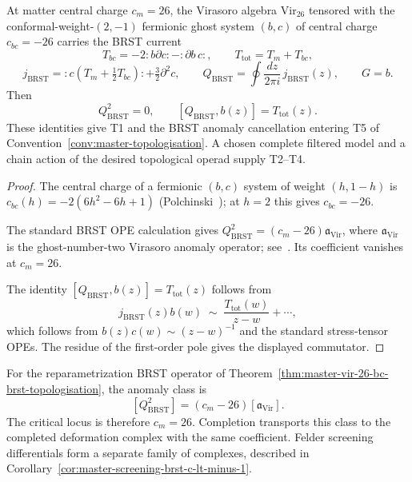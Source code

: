 \begin{theorem}
\label{thm:master-vir-26-bc-brst-topologisation}
At matter central charge $c_m = 26$, the Virasoro algebra
$\mathrm{Vir}_{26}$ tensored with the conformal-weight-$(2, -1)$
fermionic ghost system $(b, c)$ of central charge $c_{bc} = -26$
carries the BRST current
\[
T_{bc} = -2{:}b\partial c{:} - {:}\partial b\, c{:},
\qquad
T_{\mathrm{tot}} = T_m + T_{bc},
\]
\[
j_{\mathrm{BRST}}
= {:}c(T_m+\tfrac12T_{bc}){:}+\tfrac32\partial^2c,
\qquad
Q_{\mathrm{BRST}}=\oint\frac{dz}{2\pi i}\,j_{\mathrm{BRST}}(z),
\qquad
G = b.
\]
Then
\[
Q_{\mathrm{BRST}}^2=0,
\qquad
[Q_{\mathrm{BRST}}, b(z)] = T_{\mathrm{tot}}(z).
\]
These identities give T1 and the BRST anomaly cancellation entering
T5 of Convention~\ref{conv:master-topologisation}.  A chosen complete
filtered model and a chain action of the desired topological operad
supply T2--T4.
\end{theorem}

\begin{proof}
The central charge of a fermionic $(b, c)$ system of weight $(h, 1-h)$
is $c_{bc}(h) = -2(6h^2 - 6h + 1)$
\textup{(}Polchinski~\cite[eq.~(2.5.12)]{Pol98}\textup{);} at $h = 2$
this gives $c_{bc} = -26$.

The standard BRST OPE calculation gives
$Q_{\mathrm{BRST}}^2=(c_m-26)\mathfrak a_{\mathrm{Vir}}$, where
$\mathfrak a_{\mathrm{Vir}}$ is the ghost-number-two Virasoro anomaly
operator; see~\cite[\S4.3]{Pol98}.  Its coefficient vanishes at
$c_m=26$.

The identity $[Q_{\mathrm{BRST}}, b(z)] = T_{\mathrm{tot}}(z)$ follows
from
\[
j_{\mathrm{BRST}}(z) b(w)
 \;\sim\; \frac{T_{\mathrm{tot}}(w)}{z - w} + \cdots,
\]
which follows from $b(z)c(w)\sim(z-w)^{-1}$ and the standard
stress-tensor OPEs.  The residue of the first-order pole gives the
displayed commutator.
\end{proof}

\begin{remark}
\label{rem:master-vir-noncritical-completed}
For the reparametrization BRST operator of
Theorem~\ref{thm:master-vir-26-bc-brst-topologisation}, the anomaly
class is
\[
 [Q_{\mathrm{BRST}}^2]
 =(c_m-26)[\mathfrak a_{\mathrm{Vir}}].
\]
The critical locus is therefore $c_m=26$.  Completion transports this
class to the completed deformation complex with the same coefficient.
Felder screening differentials form a separate family of complexes,
described in Corollary~\ref{cor:master-screening-brst-c-lt-minus-1}.
\end{remark}

